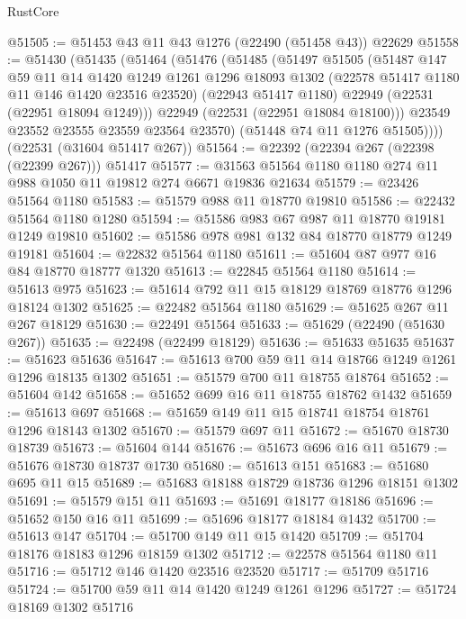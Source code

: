 \begin{lexlean}{RustCore}
\begin{coremodule}
@51505 := @51453 @43 @11 @43 @1276 (@22490 (@51458 @43)) @22629
@51558 := @51430
    (@51435
      (@51464
        (@51476
          (@51485
            (@51497
              @51505
              (@51487
                @147
                @59
                @11
                @14
                @1420
                @1249
                @1261
                @1296
                @18093
                @1302
                (@22578 @51417 @1180 @11 @146 @1420 @23516 @23520)
                (@22943 @51417 @1180)
                @22949
                (@22531 (@22951 @18094 @1249)))
              @22949
              (@22531 (@22951 @18084 @18100)))
            @23549
            @23552
            @23555
            @23559
            @23564
            @23570)
          (@51448 @74 @11 @1276 @51505))))
    (@22531 (@31604 @51417 @267))
@51564 := @22392 (@22394 @267 (@22398 (@22399 @267))) @51417
@51577 := @31563 @51564 @1180 @1180 @274 @11 @988 @1050 @11 @19812 @274 @6671 @19836 @21634
@51579 := @23426 @51564 @1180
@51583 := @51579 @988 @11 @18770 @19810
@51586 := @22432 @51564 @1180 @1280
@51594 := @51586 @983 @67 @987 @11 @18770 @19181 @1249 @19810
@51602 := @51586 @978 @981 @132 @84 @18770 @18779 @1249 @19181
@51604 := @22832 @51564 @1180
@51611 := @51604 @87 @977 @16 @84 @18770 @18777 @1320
@51613 := @22845 @51564 @1180
@51614 := @51613 @975
@51623 := @51614 @792 @11 @15 @18129 @18769 @18776 @1296 @18124 @1302
@51625 := @22482 @51564 @1180
@51629 := @51625 @267 @11 @267 @18129
@51630 := @22491 @51564
@51633 := @51629 (@22490 (@51630 @267))
@51635 := @22498 (@22499 @18129)
@51636 := @51633 @51635
@51637 := @51623 @51636
@51647 := @51613 @700 @59 @11 @14 @18766 @1249 @1261 @1296 @18135 @1302
@51651 := @51579 @700 @11 @18755 @18764
@51652 := @51604 @142
@51658 := @51652 @699 @16 @11 @18755 @18762 @1432
@51659 := @51613 @697
@51668 := @51659 @149 @11 @15 @18741 @18754 @18761 @1296 @18143 @1302
@51670 := @51579 @697 @11
@51672 := @51670 @18730 @18739
@51673 := @51604 @144
@51676 := @51673 @696 @16 @11
@51679 := @51676 @18730 @18737 @1730
@51680 := @51613 @151
@51683 := @51680 @695 @11 @15
@51689 := @51683 @18188 @18729 @18736 @1296 @18151 @1302
@51691 := @51579 @151 @11
@51693 := @51691 @18177 @18186
@51696 := @51652 @150 @16 @11
@51699 := @51696 @18177 @18184 @1432
@51700 := @51613 @147
@51704 := @51700 @149 @11 @15 @1420
@51709 := @51704 @18176 @18183 @1296 @18159 @1302
@51712 := @22578 @51564 @1180 @11
@51716 := @51712 @146 @1420 @23516 @23520
@51717 := @51709 @51716
@51724 := @51700 @59 @11 @14 @1420 @1249 @1261 @1296
@51727 := @51724 @18169 @1302 @51716

\end{coremodule}
\end{lexlean}
